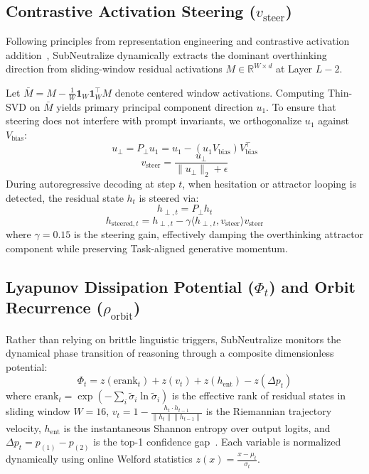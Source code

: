 \documentclass[10pt,twocolumn,letterpaper]{article}
\begin{document}
\subsection{Contrastive Activation Steering ($v_{\text{steer}}$)}
Following principles from representation engineering and contrastive activation addition~\cite{zou2023representation,rimsky2023steering,turner2023activation,huang2025manifold,sui2026tact}, SubNeutralize dynamically extracts the dominant overthinking direction from sliding-window residual activations $M \in \mathbb{R}^{W \times d}$ at Layer $L-2$. 

Let $\bar{M} = M - \frac{1}{W}\mathbf{1}_W \mathbf{1}_W^\top M$ denote centered window activations. Computing Thin-SVD on $\bar{M}$ yields primary principal component direction $u_1$. To ensure that steering does not interfere with prompt invariants, we orthogonalize $u_1$ against $V_{\text{bias}}$:
\begin{equation}
u_\perp = P_\perp u_1 = u_1 - (u_1 V_{\text{bias}}) V_{\text{bias}}^\top
\end{equation}
\begin{equation}
v_{\text{steer}} = \frac{u_\perp}{\|u_\perp\|_2 + \epsilon}
\end{equation}
During autoregressive decoding at step $t$, when hesitation or attractor looping is detected, the residual state $h_t$ is steered via:
\begin{equation}
h_{\perp, t} = P_\perp h_t
\end{equation}
\begin{equation}
h_{\text{steered}, t} = h_{\perp, t} - \gamma \langle h_{\perp, t}, v_{\text{steer}} \rangle v_{\text{steer}}
\end{equation}
where $\gamma = 0.15$ is the steering gain, effectively damping the overthinking attractor component while preserving Task-aligned generative momentum.

\subsection{Lyapunov Dissipation Potential ($\Phi_t$) and Orbit Recurrence ($\rho_{\text{orbit}}$)}
Rather than relying on brittle linguistic triggers, SubNeutralize monitors the dynamical phase transition of reasoning through a composite dimensionless potential:
\begin{equation}
\Phi_t = z(\text{erank}_t) + z(v_t) + z(h_{\text{ent}}) - z(\Delta p_t)
\end{equation}
where $\text{erank}_t = \exp\left(-\sum_i \tilde{\sigma}_i \ln \tilde{\sigma}_i\right)$ is the effective rank of residual states in sliding window $W=16$, $v_t = 1 - \frac{h_t \cdot h_{t-1}}{\|h_t\| \|h_{t-1}\|}$ is the Riemannian trajectory velocity, $h_{\text{ent}}$ is the instantaneous Shannon entropy over output logits, and $\Delta p_t = p_{(1)} - p_{(2)}$ is the top-1 confidence gap~\cite{yang2025deer,codestop2026early}. Each variable is normalized dynamically using online Welford statistics $z(x) = \frac{x - \mu_t}{\sigma_t}$.
\end{document}
